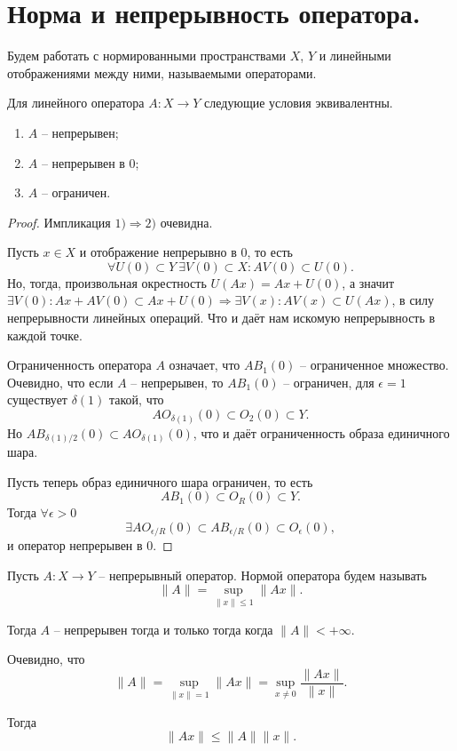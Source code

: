 \section{Норма и непрерывность оператора.}
Будем работать с нормированными пространствами $X$, $Y$ и линейными отображениями между ними, называемыми операторами.
\begin{proposition}
    Для линейного оператора $A\colon X \to Y$ следующие условия эквивалентны.
    \begin{enumerate}
        \item $A$ -- непрерывен;
        \item $A$ -- непрерывен в $0$;
        \item $A$ -- ограничен.
    \end{enumerate}
\end{proposition}
\begin{proof}
    Импликация $1) \Rightarrow 2)$ очевидна.

    Пусть $x \in X$ и отображение непрерывно в 0, то есть
    \[
        \forall U(0) \subset Y \ \exists V(0) \subset X\colon AV(0) \subset U(0).
    \]
    Но, тогда, произвольная окрестность $U(Ax) = Ax + U(0)$, а значит $\exists V(0)\colon Ax + AV(0) \subset Ax + U(0) \Rightarrow \exists V(x)\colon AV(x) \subset U(Ax)$, в силу непрерывности линейных операций.
    Что и даёт нам искомую непрерывность в каждой точке.

    Ограниченность оператора $A$ означает, что $AB_1(0)$ -- ограниченное множество.
    Очевидно, что если $A$ -- непрерывен, то $AB_1(0)$ -- ограничен, для $\epsilon = 1$ существует $\delta(1)$ такой, что
    \[
        AO_{\delta(1)}(0) \subset O_2(0) \subset Y.
    \]
    Но $AB_{\delta(1)/2}(0) \subset AO_{\delta(1)}(0)$, что и даёт ограниченность образа единичного шара.

    Пусть теперь образ единичного шара ограничен, то есть
    \[
        AB_1(0) \subset O_R(0) \subset Y.
    \]
    Тогда $\forall \epsilon > 0$
    \[
        \exists AO_{\epsilon/R}(0) \subset AB_{\epsilon/R}(0) \subset O_\epsilon(0),
    \]
    и оператор непрерывен в 0.
\end{proof}
\begin{definition}
    Пусть $A\colon X \to Y$ -- непрерывный оператор.
    Нормой оператора будем называть
    \[
        \|A\| = \sup_{\|x\| \leq 1} \|Ax\|.
    \]
\end{definition}
\begin{note}
    Тогда $A$ -- непрерывен тогда и только тогда когда $\|A\| < +\infty$.

    Очевидно, что
    \[
        \|A\| = \sup_{\|x\| = 1} \|Ax\| = \sup_{x \neq 0} \frac{\|Ax\|}{\|x\|}.
    \]

    Тогда
    \[
        \|Ax\| \leq \|A\|\|x\|.
    \]
\end{note}
